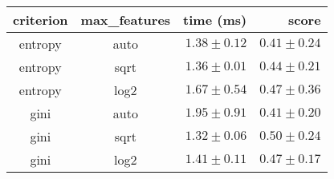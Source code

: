 \begin{tabular}{ccrr}
\toprule
\textbf{criterion} & \textbf{max\_features} & \textbf{time (ms)} & \textbf{score}\\
\midrule
entropy & auto & $1.38 \pm 0.12$ & $0.41 \pm 0.24$\\
entropy & sqrt & $1.36 \pm 0.01$ & $0.44 \pm 0.21$\\
entropy & log2 & $1.67 \pm 0.54$ & $0.47 \pm 0.36$\\
gini & auto & $1.95 \pm 0.91$ & $0.41 \pm 0.20$\\
gini & sqrt & $1.32 \pm 0.06$ & $0.50 \pm 0.24$\\
gini & log2 & $1.41 \pm 0.11$ & $0.47 \pm 0.17$\\
\bottomrule
\end{tabular}
